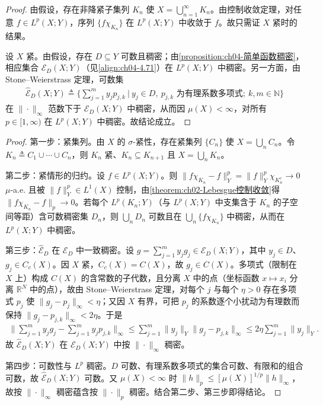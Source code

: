 \documentclass[../../main.tex]{subfiles}%
\begin{document}
\begin{proof}
由假设，存在非降紧子集列 $K_n$ 使 $X=\bigcup_{n=1}^\infty K_n$。由控制收敛定理，对任意 $f\in L^p(X;Y)$，序列 $\{f\chi_{K_n}\}$ 在 $L^p(X;Y)$ 中收敛于 $f$。故只需证 $X$ 紧时的结果。

设 $X$ 紧。由假设，存在 $D\subseteq Y$ 可数且稠密；由\cref{proposition:ch04-简单函数稠密}，相应集合 $\mathcal{E}_D(X;Y)$（见\eqref{align:ch04-4.71}）在 $L^p(X;Y)$ 中稠密。另一方面，由 Stone--Weierstrass 定理，可数集
\begin{align*}
\widehat{\mathcal{E}}_D(X;Y)\triangleq \Big\{\sum_{j=1}^m y_jp_{j,k}\ \Big|\ y_j\in D,\ p_{j,k}\text{ 为有理系数多项式};\ k,m\in\mathbb{N}\Big\}
\end{align*}
在 $\|\cdot\|_\infty$ 范数下于 $\mathcal{E}_D(X;Y)$ 中稠密，从而因 $\mu(X)<\infty$，对所有 $p\in[1,\infty)$ 在 $L^p(X;Y)$ 中稠密。故结论成立。
\end{proof}

\begin{proof}
第一步：紧集列。由 $X$ 的 $\sigma$-紧性，存在紧集列 $\{C_n\}$ 使 $X=\bigcup_nC_n$。令 $K_n\triangleq C_1\cup\cdots\cup C_n$，则 $K_n$ 紧、$K_n\subseteq K_{n+1}$ 且 $X=\bigcup_nK_n$。

第二步：紧情形的归约。设 $f\in L^p(X;Y)$。则 $\|f\chi_{K_n}-f\|_Y^p=\|f\|_Y^p\chi_{K_n^c}\to0$ $\mu$-a.e. 且被 $\|f\|_Y^p\in L^1(X)$ 控制，由\cref{theorem:ch02-Lebesgue控制收敛}得 $\|f\chi_{K_n}-f\|_p\to0$。若每个 $L^p(K_n;Y)$（与 $L^p(X;Y)$ 中支集含于 $K_n$ 的子空间等距）含可数稠密集 $D_n$，则 $\bigcup_nD_n$ 可数且在 $\bigcup_n\{f\chi_{K_n}\}$ 中稠密，从而在 $L^p(X;Y)$ 中稠密。

第三步：$\widehat{\mathcal{E}}_D$ 在 $\mathcal{E}_D$ 中一致稠密。设 $g=\sum_{j=1}^m y_jg_j\in\mathcal{E}_D(X;Y)$，其中 $y_j\in D$、$g_j\in C_c(X)$。因 $X$ 紧，$C_c(X)=C(X)$，故 $g_j\in C(X)$。多项式（限制在 $X$ 上）构成 $C(X)$ 的含常数的子代数，且分离 $X$ 中的点（坐标函数 $x\mapsto x_i$ 分离 $\mathbb{R}^N$ 中的点），故由 Stone--Weierstrass 定理，对每个 $j$ 与每个 $\eta>0$ 存在多项式 $p_j$ 使 $\|g_j-p_j\|_\infty<\eta$；又因 $X$ 有界，可把 $p_j$ 的系数逐个小扰动为有理数而保持 $\|g_j-p_{j,k}\|_\infty<2\eta$。于是
\begin{align*}
\Big\|\sum_{j=1}^m y_jg_j-\sum_{j=1}^m y_jp_{j,k}\Big\|_\infty\leqslant\sum_{j=1}^m\|y_j\|_Y\|g_j-p_{j,k}\|_\infty\leqslant2\eta\sum_{j=1}^m\|y_j\|_Y .
\end{align*}
故 $\widehat{\mathcal{E}}_D(X;Y)$ 在 $\mathcal{E}_D(X;Y)$ 中按 $\|\cdot\|_\infty$ 稠密。

第四步：可数性与 $L^p$ 稠密。$D$ 可数、有理系数多项式的集合可数、有限和的组合可数，故 $\widehat{\mathcal{E}}_D(X;Y)$ 可数。又 $\mu(X)<\infty$ 时 $\|h\|_p\leqslant[\mu(X)]^{1/p}\|h\|_\infty$，故按 $\|\cdot\|_\infty$ 稠密蕴含按 $\|\cdot\|_p$ 稠密。结合第二步、第三步即得结论。
\end{proof}
\end{document}
